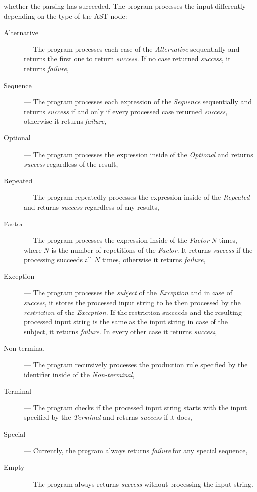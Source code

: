 \documentclass[english,bachelors,forcepolishlogotype]{wizthesis}
\begin{document}
\noindent whether the parsing has succeeded. The program
processes the input differently depending on the type of the AST node:
\begin{description}
  \item[Alternative] --- The program processes each case of the
  \emph{Alternative} sequentially and returns the first one to return
  \emph{success}. If no case returned \emph{success}, it returns \emph{failure},
  \item[Sequence] --- The program processes each expression of the
  \emph{Sequence} sequentially and returns \emph{success} if and only if every
  processed case returned \emph{success}, otherwise it returns \emph{failure},
  \item[Optional] --- The program processes the expression inside of the
  \emph{Optional} and returns \emph{success} regardless of the result,
  \item[Repeated] --- The program repeatedly processes the expression inside of
  the \emph{Repeated} and returns \emph{success} regardless of any results,
  \item[Factor] --- The program processes the expression inside of the
  \emph{Factor} $N$ times, where $N$ is the number of repetitions of the
  \emph{Factor}. It returns \emph{success} if the processing succeeds all $N$
  times, otherwise it returns \emph{failure},
  \item[Exception] --- The program processes the \emph{subject} of the
  \emph{Exception} and in case of \emph{success}, it stores the processed input
  string to be then processed by the \emph{restriction} of the \emph{Exception}.
  If the restriction succeeds and the resulting processed input string is the
  same as the input string in case of the subject, it returns \emph{failure}. In
  every other case it returns \emph{success},
  \item[Non-terminal] --- The program recursively processes the production rule
  specified by the identifier inside of the \emph{Non-terminal},
  \item[Terminal] --- The program checks if the processed input string starts with
  the input specified by the \emph{Terminal} and returns \emph{success} if it
  does,
  \item[Special] --- Currently, the program always returns \emph{failure} for any
  special sequence,
  \item[Empty] --- The program always returns \emph{success} without processing
  the input string.
\end{description}
\end{document}

